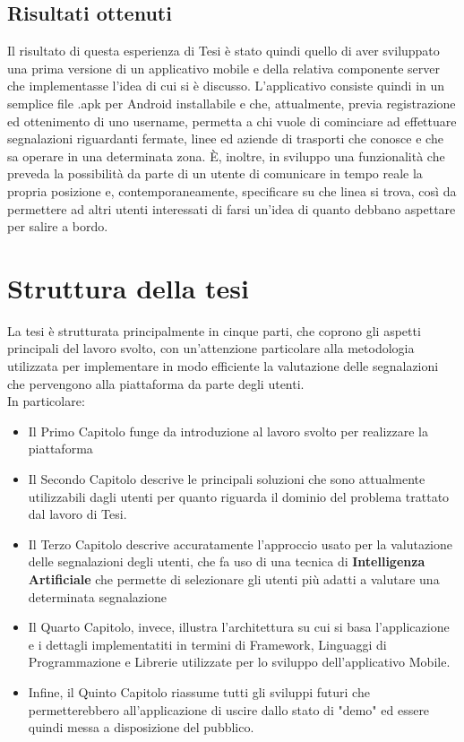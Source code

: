    \subsection{Risultati ottenuti}
        Il risultato di questa esperienza di Tesi è stato quindi quello di aver sviluppato una prima versione di un applicativo mobile e della relativa componente server che implementasse l'idea di cui si è discusso. L'applicativo consiste quindi in un semplice file .apk per Android installabile e che, attualmente, previa registrazione ed ottenimento di uno username, permetta a chi vuole di cominciare ad effettuare segnalazioni riguardanti fermate, linee ed aziende di trasporti che conosce e che sa operare in una determinata zona.
        È, inoltre, in sviluppo una funzionalità che preveda la possibilità da parte di un utente di comunicare in tempo reale la propria posizione e, contemporaneamente, specificare su che linea si trova, così da permettere ad altri utenti interessati di farsi un'idea di quanto debbano aspettare per salire a bordo.
        
        \newpage

\section{Struttura della tesi}
        La tesi è strutturata principalmente in cinque parti, che coprono gli aspetti principali del lavoro svolto, con un'attenzione particolare alla metodologia utilizzata per implementare in modo efficiente la valutazione delle segnalazioni che pervengono alla piattaforma da parte degli utenti. \\
        In particolare:
        \begin{itemize}
            \item Il Primo Capitolo funge da introduzione al lavoro svolto per realizzare la piattaforma
            \item Il Secondo Capitolo descrive le principali soluzioni che sono attualmente utilizzabili dagli utenti per quanto riguarda il dominio del problema trattato dal lavoro di Tesi.
            \item Il Terzo Capitolo descrive accuratamente l'approccio usato per la valutazione delle segnalazioni degli utenti, che fa uso di una tecnica di \textbf{Intelligenza Artificiale} che permette di selezionare gli utenti più adatti a valutare una determinata segnalazione
            \item Il Quarto Capitolo, invece, illustra l'architettura su cui si basa l'applicazione e i dettagli implementatiti in termini di Framework, Linguaggi di Programmazione e Librerie utilizzate per lo sviluppo dell'applicativo Mobile.
            \item Infine, il Quinto Capitolo riassume tutti gli sviluppi futuri che permetterebbero all'applicazione di uscire dallo stato di "demo" ed essere quindi messa a disposizione del pubblico.
        \end{itemize}
